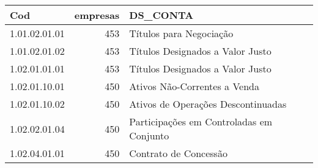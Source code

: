 \begin{table}[ht]
\centering
\begin{tabular}{lrl}
  \hline
Cod & empresas & DS\_CONTA \\ 
  \hline
1.01.02.01.01 & 453 & Títulos para Negociação \\ 
  1.01.02.01.02 & 453 & Títulos Designados a Valor Justo \\ 
  1.02.01.01.01 & 453 & Títulos Designados a Valor Justo \\ 
  1.02.01.10.01 & 450 & Ativos Não-Correntes a Venda \\ 
  1.02.01.10.02 & 450 & Ativos de Operações Descontinuadas \\ 
  1.02.02.01.04 & 450 & Participações em Controladas em Conjunto \\ 
  1.02.04.01.01 & 450 & Contrato de Concessão \\ 
   \hline
\end{tabular}
\end{table}
